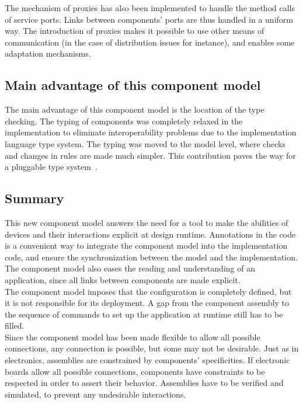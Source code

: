The mechanism of proxies has also been implemented to handle the method calls of service ports. Links between components' ports are thus handled in a uniform way. The introduction of proxies makes it possible to use other means of communication (in the case of distribution issues for instance), and enables some adaptation mechanisms.\\

\subsection{Main advantage of this component model}

The main advantage of this component model is the location of the type checking. The typing of components was completely relaxed in the implementation to eliminate interoperability problems due to the implementation language type system. The typing was moved to the model level, where checks and changes in rules are made much simpler. This contribution paves the way for a pluggable type system~\cite{PapiACPE2008,Bracha:2004}.\\


\subsection{Summary}

This new component model answers the need for a tool to make the abilities of devices and their interactions explicit at design runtime. Annotations in the code is a convenient way to integrate the component model into the implementation code, and ensure the synchronization between the model and the implementation. The component model also eases the reading and understanding of an application, since all links between components are made explicit.\\

The component model imposes that the configuration is completely defined, but it is not responsible for its deployment. A gap from the component assembly to the sequence of commands to set up the application at runtime still has to be filled.\\
Since the component model has been made flexible to allow all possible connections, any connection is possible, but some may not be desirable. Just as in electronics, assemblies are constrained by components' specificities. If electronic boards allow all possible connections, components have constraints to be respected in order to assert their behavior. Assemblies have to be verified and simulated, to prevent any undesirable interactions.\\

